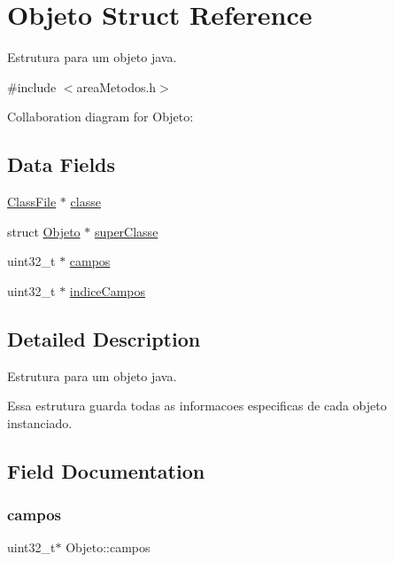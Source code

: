 \hypertarget{structObjeto}{}\section{Objeto Struct Reference}
\label{structObjeto}


Estrutura para um objeto java.  




{\ttfamily \#include $<$area\+Metodos.\+h$>$}



Collaboration diagram for Objeto\+:
\subsection*{Data Fields}
\begin{DoxyCompactItemize}
\item 
\hyperlink{structClassFile}{Class\+File} $\ast$ \hyperlink{structObjeto_a5596a470c07ffff562f21911fc34fbf3}{classe}
\item 
struct \hyperlink{structObjeto}{Objeto} $\ast$ \hyperlink{structObjeto_aa7b097e2dea86e221a2c7fc1c85b6fe5}{super\+Classe}
\item 
uint32\+\_\+t $\ast$ \hyperlink{structObjeto_a744a42e5e611e1d2d2f65842f4117f7b}{campos}
\item 
uint32\+\_\+t $\ast$ \hyperlink{structObjeto_a7561a3d822608137d47d2babf2dd9048}{indice\+Campos}
\end{DoxyCompactItemize}


\subsection{Detailed Description}
Estrutura para um objeto java. 

Essa estrutura guarda todas as informacoes especificas de cada objeto instanciado. 

\subsection{Field Documentation}
\mbox{\label{structObjeto_a744a42e5e611e1d2d2f65842f4117f7b}} 
\subsubsection{\texorpdfstring{campos}{campos}}
{\footnotesize\ttfamily uint32\+\_\+t$\ast$ Objeto\+::campos}

